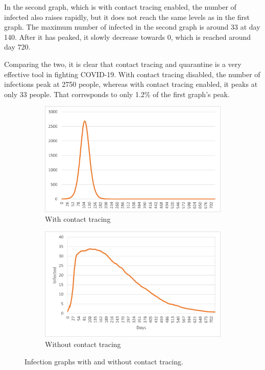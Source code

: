 In the second graph, which is with contact tracing enabled, the number of infected also raises rapidly, but it does not reach the same levels as in the first graph. The maximum number of infected in the second graph is around 33 at day 140. After it has peaked, it slowly decrease towards 0, which is reached around day 720.

Comparing the two, it is clear that contact tracing and quarantine is a very effective tool in fighting COVID-19. With contact tracing disabled, the number of infections peak at 2750 people, whereas with contact tracing enabled, it peaks at only 33 people. That corresponds to only 1.2\% of the first graph's peak.

\begin{figure}[H]
 \centering
  \begin{subfigure}{.45\textwidth}
    \centering
    \includegraphics[width=.95\linewidth]{0_billeder/covidInfectionGraphA.png}
    \caption{With contact tracing}
    \label{Subfig:covidInfGraphA}
  \end{subfigure}
  \begin{subfigure}{.45\textwidth}
    \centering
    \includegraphics[width=.95\linewidth]{0_billeder/covidInfectionGraphB.png}
    \caption{Without contact tracing}
    \label{Subfig:covidInfGraphB}
  \end{subfigure}
 \caption{Infection graphs with and without contact tracing.}
 \label{Fig:covidInfGraphs}
\end{figure}
